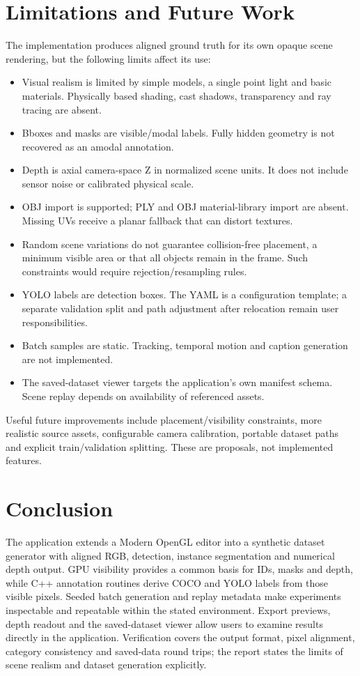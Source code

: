 \documentclass[12pt,a4paper]{article}
\begin{document}
\section{Limitations and Future Work}
The implementation produces aligned ground truth for its own opaque scene rendering, but the following limits affect its use:
\begin{itemize}
\item Visual realism is limited by simple models, a single point light and basic materials. Physically based shading, cast shadows, transparency and ray tracing are absent.
\item Bboxes and masks are visible/modal labels. Fully hidden geometry is not recovered as an amodal annotation.
\item Depth is axial camera-space Z in normalized scene units. It does not include sensor noise or calibrated physical scale.
\item OBJ import is supported; PLY and OBJ material-library import are absent. Missing UVs receive a planar fallback that can distort textures.
\item Random scene variations do not guarantee collision-free placement, a minimum visible area or that all objects remain in the frame. Such constraints would require rejection/resampling rules.
\item YOLO labels are detection boxes. The YAML is a configuration template; a separate validation split and path adjustment after relocation remain user responsibilities.
\item Batch samples are static. Tracking, temporal motion and caption generation are not implemented.
\item The saved-dataset viewer targets the application's own manifest schema. Scene replay depends on availability of referenced assets.
\end{itemize}
Useful future improvements include placement/visibility constraints, more realistic source assets, configurable camera calibration, portable dataset paths and explicit train/validation splitting. These are proposals, not implemented features.

\section{Conclusion}
The application extends a Modern OpenGL editor into a synthetic dataset generator with aligned RGB, detection, instance segmentation and numerical depth output. GPU visibility provides a common basis for IDs, masks and depth, while C++ annotation routines derive COCO and YOLO labels from those visible pixels. Seeded batch generation and replay metadata make experiments inspectable and repeatable within the stated environment. Export previews, depth readout and the saved-dataset viewer allow users to examine results directly in the application. Verification covers the output format, pixel alignment, category consistency and saved-data round trips; the report states the limits of scene realism and dataset generation explicitly.
\end{document}
